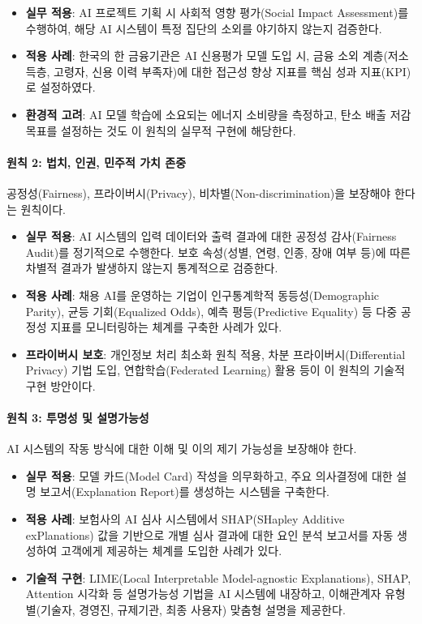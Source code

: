 \begin{itemize}
 \item \textbf{실무 적용}: AI 프로젝트 기획 시 사회적 영향 평가(Social Impact Assessment)를 수행하여, 해당 AI 시스템이 특정 집단의 소외를 야기하지 않는지 검증한다.
 \item \textbf{적용 사례}: 한국의 한 금융기관은 AI 신용평가 모델 도입 시, 금융 소외 계층(저소득층, 고령자, 신용 이력 부족자)에 대한 접근성 향상 지표를 핵심 성과 지표(KPI)로 설정하였다.
 \item \textbf{환경적 고려}: AI 모델 학습에 소요되는 에너지 소비량을 측정하고, 탄소 배출 저감 목표를 설정하는 것도 이 원칙의 실무적 구현에 해당한다.
\end{itemize}

\paragraph{원칙 2: 법치, 인권, 민주적 가치 존중}
공정성(Fairness), 프라이버시(Privacy), 비차별(Non-discrimination)을 보장해야 한다는 원칙이다.

\begin{itemize}
 \item \textbf{실무 적용}: AI 시스템의 입력 데이터와 출력 결과에 대한 공정성 감사(Fairness Audit)를 정기적으로 수행한다. 보호 속성(성별, 연령, 인종, 장애 여부 등)에 따른 차별적 결과가 발생하지 않는지 통계적으로 검증한다.
 \item \textbf{적용 사례}: 채용 AI를 운영하는 기업이 인구통계학적 동등성(Demographic Parity), 균등 기회(Equalized Odds), 예측 평등(Predictive Equality) 등 다중 공정성 지표를 모니터링하는 체계를 구축한 사례가 있다.
 \item \textbf{프라이버시 보호}: 개인정보 처리 최소화 원칙 적용, 차분 프라이버시(Differential Privacy) 기법 도입, 연합학습(Federated Learning) 활용 등이 이 원칙의 기술적 구현 방안이다.
\end{itemize}

\paragraph{원칙 3: 투명성 및 설명가능성}
AI 시스템의 작동 방식에 대한 이해 및 이의 제기 가능성을 보장해야 한다.\cite{arrieta2020explainable}

\begin{itemize}
 \item \textbf{실무 적용}: 모델 카드(Model Card) 작성을 의무화하고, 주요 의사결정에 대한 설명 보고서(Explanation Report)를 생성하는 시스템을 구축한다.
 \item \textbf{적용 사례}: 보험사의 AI 심사 시스템에서 SHAP(SHapley Additive exPlanations) 값을 기반으로 개별 심사 결과에 대한 요인 분석 보고서를 자동 생성하여 고객에게 제공하는 체계를 도입한 사례가 있다.
 \item \textbf{기술적 구현}: LIME(Local Interpretable Model-agnostic Explanations), SHAP, Attention 시각화 등 설명가능성 기법을 AI 시스템에 내장하고, 이해관계자 유형별(기술자, 경영진, 규제기관, 최종 사용자) 맞춤형 설명을 제공한다.
\end{itemize}

